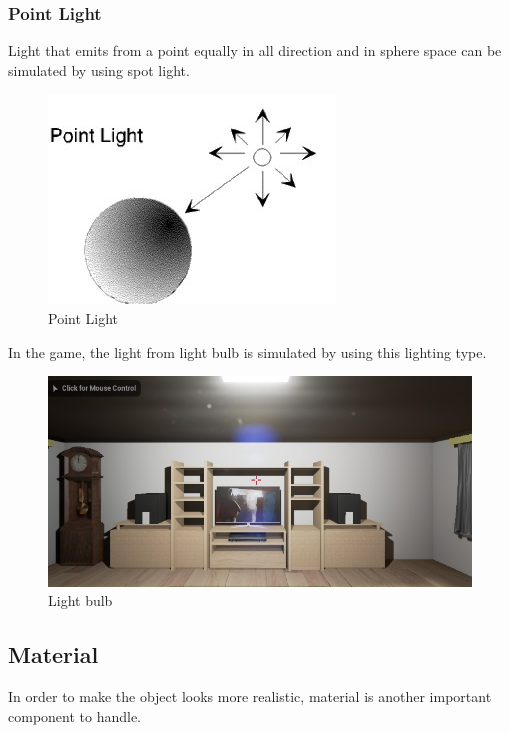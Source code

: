 \documentclass{article}
\begin{document}
\subsubsection{Point Light}
Light that emits from a point equally in all direction and in sphere space  can be simulated by using spot light.
\bigskip
\begin{figure}[hp!]
\centering
\includegraphics[scale=0.6]{point_light.jpg}
\caption{Point Light}
\label{fig:spot_light1}
\end{figure}
In the game, the light from light bulb is simulated by using this lighting type.
\bigskip
\begin{figure}[hp!]
\centering
\includegraphics[scale=0.6]{pointLight1.jpg}
\caption{Light bulb}
\label{fig:spot_light1}
\end{figure}

\clearpage
\subsection{Material}
In order to make the object looks more realistic, material is another important component to handle.\\
\end{document}
